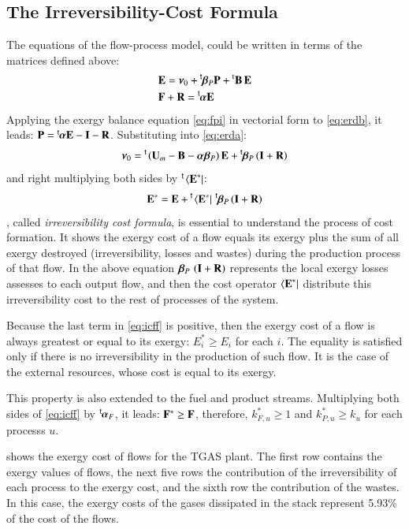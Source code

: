 \documentclass{ecos}
\begin{document}
\subsection{The Irreversibility-Cost Formula}
The equations of the flow-process model, could be written in terms of the matrices defined above:
\begin{align}
&\mathbf{E}=\bm{\nu}_0+\prescript{\smash{\mathsf{t}}}{}{\mskip-1mu}\bm{\beta}_P\mathbf{P}+\prescript{\smash{\mathrm{t}}}{}{\mathbf{B}}\,\mathbf{E} \label{eq:erda}\\
&\mathbf{F}+\mathbf{R}=\prescript{\smash{\mathsf{t}}}{}{\mskip-1mu}\bm{\alpha}\mathbf{E} \label{eq:erdb}
\end{align}
Applying the exergy balance equation \cref{eq:fpi} in vectorial form to \cref{eq:erdb}, it leads: ${\mathbf{P}=\prescript{\smash{\mathsf{t}}}{}{\mskip-1mu}\bm{\alpha}\mathbf{E}-\mathbf{I}-\mathbf{R}}$. Substituting into \cref{eq:erda}:
\begin{equation}
\bm{\nu}_0=\prescript{\smash{\mathsf{t}}}{}{\mskip-1mu}\left(\mathbf{U}_m-\mathbf{B}-\bm{\alpha}\bm{\beta}_P\right)\mathbf{E}+\prescript{\smash{\mathsf{t}}}{}{\mskip-1mu}\bm{\beta}_P\left(\mathbf{I}+\mathbf{R}\right)
\end{equation}
and right multiplying both sides by $\prescript{\smash{\mathsf{t}}}{}{\mskip-1mu}\left\langle {\textbf{E}^\ast } \right|$:
\begin{equation}
\label{eq:icff}
\mathbf{E}^*=\mathbf{E}+\prescript{\smash{\mathsf{t}}}{}{\mskip-1mu}\left\langle {\textbf{E}^\ast } \right|\,\prescript{\smash{\mathsf{t}}}{}{\mskip-1mu}\bm{\beta}_P\left(\mathbf{I}+\mathbf{R}\right)
\end{equation}
, called \emph{irreversibility cost formula}, is essential to understand the process of cost formation. It shows the exergy cost of a flow equals its exergy plus the sum of all exergy destroyed (irreversibility, losses and wastes) during the production process of that flow. In the above equation $\bm{\beta}_P\,\left(\mathbf{I}+\mathbf{R}\right)$ represents the local exergy losses assesses to each output flow, and then the cost operator $\left\langle {\textbf{E}^\ast } \right|$  distribute this irreversibility cost to the rest of processes of the system.

Because the last term in \cref{eq:icff} is  positive, then the exergy cost of a flow is always greatest or equal to its exergy: $E_i^* \ge E_i$ for each $i$. The equality is satisfied only if there is no irreversibility in the production of such flow. It is the case of the external resources, whose cost is equal to its exergy. 

This property is also extended to the fuel and product streams. Multiplying both sides of \cref{eq:icff} by $\prescript{\smash{\mathsf{t}}}{}{\mskip-1mu}\bm{\alpha}_F$, it leads: $\mathbf{F}^*\ge\mathbf{F}$, therefore, {$k_{F,u}^{*}\ge 1$} and {$k_{P,u}^{*}\ge k_u$} for each processs $u$.

 shows the exergy cost of flows for the TGAS plant.
The first row contains the exergy values of flows, the next five rows the contribution of the irreversibility of each process to the exergy cost, and the sixth row the contribution of the wastes. In this case, the exergy costs of the gases dissipated in the stack represent 5.93\% of the cost of the flows.
\end{document}
